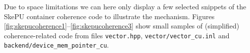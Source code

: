 Due to space limitations we can here only display a few selected 
snippets of the SkePU container coherence code to illustrate the mechanism.
Figures \ref{fig:skepucoherence1}--\ref{fig:skepucoherence3} show small
samples of (simplified) coherence-related
code from files \texttt{vector.hpp}, %
 \texttt{vector/vector\_cu.inl} and \texttt{backend/device\_mem\_pointer\_cu}.

  
%
%   
